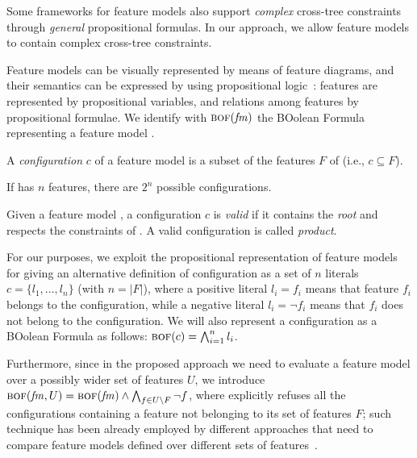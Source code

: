 \begin{tikzborder}{\cite{Gargantini16:validation}}
\begin{tikzborder}{\cite{gargantini_combinatorial_2017}}
\begin{tikzborder}{\cite{garn2019}}
\begin{tikzborder}{\cite{arcaini2019achieving}}
	Some frameworks for feature models also support {\it complex} cross-tree constraints \cite{knuppel_is_2017} through \textit{general} propositional formulas. In our approach, we allow feature models to contain complex cross-tree constraints.
	
	Feature models can be visually represented by means of feature diagrams, and their semantics can be expressed by using propositional logic~\cite{batory2005feature,benavides2010automated}: features are represented by propositional variables, and relations among features by propositional formulae. We identify with $\textsc{bof}(\mathit{fm})$ the \textsc{BO}olean \textsc{F}ormula representing a feature model \fm.
	
	\begin{mydef}\label{def:configuration1}
		A \emph{configuration} $c$ of a feature model \fm is a subset of the features $F$ of \fm (i.e., $c \subseteq F$).
	\end{mydef}
	
	If \fm has $n$ features, there are $2^n$ possible configurations.
	
	\begin{mydef}\label{def:validity}
		Given a feature model \fm, a configuration $c$ is \emph{valid} if it contains the \emph{root} and respects the constraints of \fm. A valid configuration is called \emph{product}.
	\end{mydef}
	
	For our purposes, we exploit the propositional representation of feature models for giving an alternative definition of configuration as a set of $n$ literals $c = \{l_1, \ldots, l_n\}$ (with $n = |F|$), where a positive literal $l_i=f_i$ means that feature $f_i$ belongs to the configuration, while a negative literal $l_i=\neg f_i$ means that $f_i$ does not belong to the configuration. We will also represent a configuration as a BOolean Formula as follows: $\textsc{bof}(c) = \bigwedge_{i=1}^n l_i$.
	
	Furthermore, since in the proposed approach we need to evaluate a feature model over a possibly wider set of features $U$, we introduce $\textsc{bof}(\mathit{fm}, U) = \textsc{bof}(\mathit{fm}) \wedge \bigwedge_{f \in U \setminus F} \neg f$, where \fm explicitly refuses all the configurations containing a feature not belonging to its set of features $F$; such technique has been already employed by different approaches that need to compare feature models defined over different sets of features~\cite{thum_reasoning_2009,icst2015}.
	\be
	

\end{tikzborder}
\end{tikzborder}
\end{tikzborder}
\end{tikzborder}
